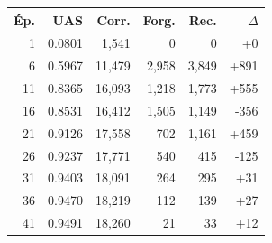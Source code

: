 \begin{table}[ht]
\hfill
\begin{minipage}[t]{0.42\linewidth}
\centering\tiny
\begin{tabular}{rrrrrr}
\toprule
\textbf{Ép.} & \textbf{UAS} & \textbf{Corr.} & \textbf{Forg.} & \textbf{Rec.} & \textbf{$\Delta$} \\
\midrule
1 & 0.0801 & 1,541 & 0 & 0 & +0 \\
6 & 0.5967 & 11,479 & 2,958 & 3,849 & +891 \\
11 & 0.8365 & 16,093 & 1,218 & 1,773 & +555 \\
16 & 0.8531 & 16,412 & 1,505 & 1,149 & -356 \\
21 & 0.9126 & 17,558 & 702 & 1,161 & +459 \\
26 & 0.9237 & 17,771 & 540 & 415 & -125 \\
31 & 0.9403 & 18,091 & 264 & 295 & +31 \\
36 & 0.9470 & 18,219 & 112 & 139 & +27 \\
41 & 0.9491 & 18,260 & 21 & 33 & +12 \\
\bottomrule
\end{tabular}
\end{minipage}
\end{table}
